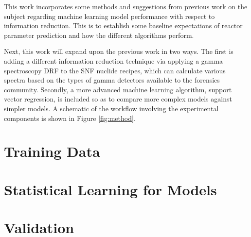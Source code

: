 This work incorporates some methods and suggestions from previous work on the
subject \cite{dayman_feasibility_2013} regarding machine learning model
performance with respect to information reduction.  This is to establish some
baseline expectations of reactor parameter prediction and how the different
algorithms perform. 

Next, this work will expand upon the previous work in two ways.  The first is
adding a different information reduction technique via applying a gamma
spectroscopy \gls{DRF} to the \gls{SNF} nuclide recipes, which can calculate
various spectra based on the types of gamma detectors available to the
forensics community.  Secondly, a more advanced machine learning algorithm,
support vector regression, is included so as to compare more complex models
against simpler models.  A schematic of the workflow involving the experimental
components is shown in Figure \ref{fig:method}.

\section{Training Data}
\label{sec:training}


\section{Statistical Learning for Models}
\label{sec:statmodel}


\section{Validation}
\label{sec:valid}

